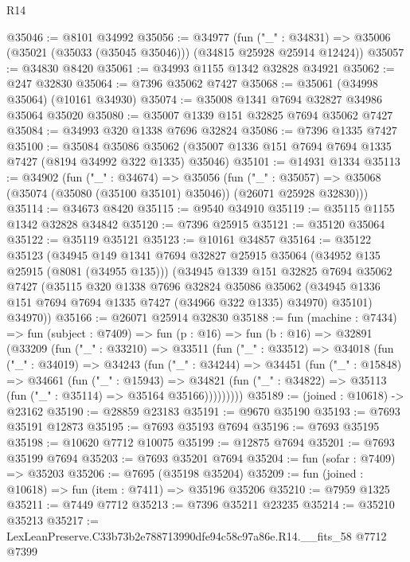 \begin{lexlean}{R14}
\begin{coremodule}
@35046 := @8101 @34992
@35056 := @34977
    (fun ("_" : @34831) => @35006 (@35021 (@35033 (@35045 @35046))) (@34815 @25928 @25914 @12424))
@35057 := @34830 @8420
@35061 := @34993 @1155 @1342 @32828 @34921
@35062 := @247 @32830
@35064 := @7396 @35062 @7427
@35068 := @35061 (@34998 @35064) (@10161 @34930)
@35074 := @35008 @1341 @7694 @32827 @34986 @35064 @35020
@35080 := @35007 @1339 @151 @32825 @7694 @35062 @7427
@35084 := @34993 @320 @1338 @7696 @32824
@35086 := @7396 @1335 @7427
@35100 := @35084
    @35086
    @35062
    (@35007 @1336 @151 @7694 @7694 @1335 @7427 (@8194 @34992 @322 @1335) @35046)
@35101 := @14931 @1334
@35113 := @34902
    (fun ("_" : @34674) =>
    @35056
      (fun ("_" : @35057) =>
      @35068 (@35074 (@35080 (@35100 @35101) @35046)) (@26071 @25928 @32830)))
@35114 := @34673 @8420
@35115 := @9540 @34910
@35119 := @35115 @1155 @1342 @32828 @34842
@35120 := @7396 @25915
@35121 := @35120 @35064
@35122 := @35119 @35121
@35123 := @10161 @34857
@35164 := @35122
    @35123
    (@34945
      @149
      @1341
      @7694
      @32827
      @25915
      @35064
      (@34952 @135 @25915 (@8081 (@34955 @135)))
      (@34945
        @1339
        @151
        @32825
        @7694
        @35062
        @7427
        (@35115
          @320
          @1338
          @7696
          @32824
          @35086
          @35062
          (@34945 @1336 @151 @7694 @7694 @1335 @7427 (@34966 @322 @1335) @34970)
          @35101)
        @34970))
@35166 := @26071 @25914 @32830
@35188 := fun (machine : @7434) =>
  fun (subject : @7409) =>
  fun (p : @16) =>
  fun (b : @16) =>
  @32891
    (@33209
      (fun ("_" : @33210) =>
      @33511
        (fun ("_" : @33512) =>
        @34018
          (fun ("_" : @34019) =>
          @34243
            (fun ("_" : @34244) =>
            @34451
              (fun ("_" : @15848) =>
              @34661
                (fun ("_" : @15943) =>
                @34821 (fun ("_" : @34822) => @35113 (fun ("_" : @35114) => @35164 @35166)))))))))
@35189 := (joined : @10618) -> @23162
@35190 := @28859 @23183
@35191 := @9670 @35190
@35193 := @7693 @35191 @12873
@35195 := @7693 @35193 @7694
@35196 := @7693 @35195
@35198 := @10620 @7712 @10075
@35199 := @12875 @7694
@35201 := @7693 @35199 @7694
@35203 := @7693 @35201 @7694
@35204 := fun (sofar : @7409) => @35203
@35206 := @7695 (@35198 @35204)
@35209 := fun (joined : @10618) => fun (item : @7411) => @35196 @35206
@35210 := @7959 @1325
@35211 := @7449 @7712
@35213 := @7396 @35211 @23235
@35214 := @35210 @35213
@35217 := LexLeanPreserve.C33b73b2e788713990dfe94c58c97a86e.R14.__fits_58 @7712 @7399

\end{coremodule}
\end{lexlean}
